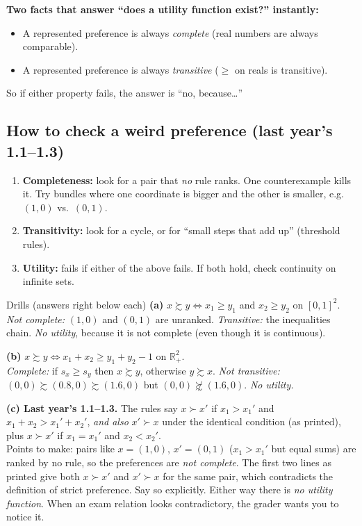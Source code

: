 \documentclass[11pt]{article}
\begin{document}
\textbf{Two facts that answer ``does a utility function exist?'' instantly:}
\begin{itemize}
\item A represented preference is always \emph{complete} (real numbers are always comparable).
\item A represented preference is always \emph{transitive} ($\ge$ on reals is transitive).
\end{itemize}
So if either property fails, the answer is ``no, because\ldots''

\subsection*{How to check a weird preference (last year's 1.1--1.3)}
\begin{enumerate}
\item \textbf{Completeness:} look for a pair that \emph{no} rule ranks. One counterexample kills it. Try bundles where one coordinate is bigger and the other is smaller, e.g. $(1,0)$ vs.\ $(0,1)$.
\item \textbf{Transitivity:} look for a cycle, or for ``small steps that add up'' (threshold rules).
\item \textbf{Utility:} fails if either of the above fails. If both hold, check continuity on infinite sets.
\end{enumerate}

\begin{workbox}{Drills (answers right below each)}
\textbf{(a)} $x\succsim y\iff x_1\ge y_1$ and $x_2\ge y_2$ on $[0,1]^2$.\\
\emph{Not complete:} $(1,0)$ and $(0,1)$ are unranked. \emph{Transitive:} the inequalities chain. \emph{No utility}, because it is not complete (even though it is continuous).

\textbf{(b)} $x\succsim y\iff x_1+x_2\ge y_1+y_2-1$ on $\mathbb{R}^2_+$.\\
\emph{Complete:} if $s_x\ge s_y$ then $x\succsim y$, otherwise $y\succsim x$. \emph{Not transitive:} $(0,0)\succsim(0.8,0)\succsim(1.6,0)$ but $(0,0)\not\succsim(1.6,0)$. \emph{No utility.}

\textbf{(c) Last year's 1.1--1.3.} The rules say $x\succ x'$ if $x_1>x_1'$ and $x_1+x_2>x_1'+x_2'$, \emph{and also} $x'\succ x$ under the identical condition (as printed), plus $x\succ x'$ if $x_1=x_1'$ and $x_2<x_2'$.\\
Points to make: pairs like $x=(1,0)$, $x'=(0,1)$ ($x_1>x_1'$ but equal sums) are ranked by no rule, so the preferences are \emph{not complete}. The first two lines as printed give both $x\succ x'$ and $x'\succ x$ for the same pair, which contradicts the definition of strict preference. Say so explicitly. Either way there is \emph{no utility function}. When an exam relation looks contradictory, the grader wants you to notice it.
\end{workbox}
\end{document}
